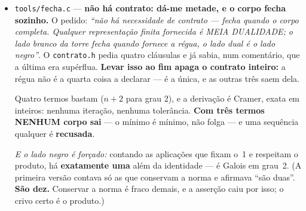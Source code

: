 \documentclass[11pt]{article}
\newcommand{\code}[1]{\texttt{\small #1}}
\theoremstyle{plain}
\theoremstyle{remark}
\begin{document}
\begin{itemize}
\textbf{Uma forma para cada operação:} a algébrica soma bem ($z = a + b\sigma$, componente a
componente), a polar multiplica bem ($\rho$ multiplica, $\theta$ soma) --- e a ponte é
$\prod = \exp\circ\Sigma\circ\log$. \emph{Centrando a base} em $\tau = \sigma - B/2$ sai
$\tau^2 = \Delta/4$: \textbf{o regime inteiro é o SINAL do $\Delta$}, e nada mais ---
$\Delta<0$ o círculo (cos), $\Delta>0$ a hipérbole (cosh), $\Delta=0$ a reta. As três são a mesma
série, e a lei do produto vale nas três \textbf{sem caso especial}.

\emph{E a dualidade fecha:} $\langle x,y\rangle = \rho\rho\cos_\Delta(\Delta\theta)$ e
$x \wedge y = \rho\rho\sin_\Delta(\Delta\theta)/|\tau|$ --- \textbf{o direto vê o cosseno, o cruzado
vê o seno}. Sob o espelho $\nu$, o \textbf{direto fica igual} e o \textbf{cruzado troca de sinal}:
a peça que mede é a mesma dos dois lados da torre, e a que ordena é a que se inverte.

\textbf{Duas coisas que as asserções apanharam e que são do corpo, não do código:} a polar tem
\textbf{ramo} e a algébrica não (fora do cone não há ângulo real --- 25 dos 49 pontos no ouro), e a
polar carrega um \textbf{sinal} que o círculo não precisa, porque $\cosh\theta$ nunca é negativo:
\textbf{dois bits}, sem os quais a volta erra por 12. \textbf{10 unidades, resíduo 0.}

\item \code{tools/fecha.c} --- \textbf{não há contrato: dá-me metade, e o corpo fecha sozinho.}
O pedido: \emph{``não há necessidade de contrato --- fecha quando o corpo completa. Qualquer
representação finita fornecida é MEIA DUALIDADE; o lado branco da torre fecha quando fornece a
régua, o lado dual é o lado negro''}. O \code{contrato.h} pedia quatro cláusulas e já sabia, num
comentário, que a última era supérflua. \textbf{Levar isso ao fim apaga o contrato inteiro:} a
régua não é a quarta coisa a declarar --- é a única, e as outras três saem dela.

Quatro termos bastam ($n+2$ para grau 2), e a derivação é Cramer, exata em inteiros: nenhuma
iteração, nenhuma tolerância. \textbf{Com três termos NENHUM corpo sai} --- o mínimo é mínimo, não
folga --- e uma sequência qualquer é \textbf{recusada}.

\emph{E o lado negro é forçado:} contando as aplicações que fixam o~1 e respeitam o produto, há
\textbf{exatamente uma} além da identidade --- é Galois em grau~2. (A primeira versão contava só as
que conservam a norma e afirmava ``são duas''. \textbf{São dez.} Conservar a norma é fraco demais, e
a asserção caiu por isso; o crivo certo é o produto.)


\end{itemize}
\end{document}
